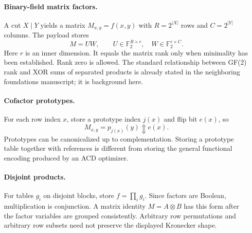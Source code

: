 \documentclass[11pt]{article}
\newcommand{\F}{\mathbb F_2}
\newcommand{\xor}{\mathbin{\Updownarrow}}
\theoremstyle{definition}\newtheorem{definition}[theorem]{Definition}
\theoremstyle{remark}\newtheorem{remark}[theorem]{Remark}
\begin{document}
\paragraph{Binary-field matrix factors.}
A cut $X\mid Y$ yields a matrix $M_{x,y}=f(x,y)$ with $R=2^{|X|}$ rows and $C=2^{|Y|}$ columns. The payload stores
\begin{equation}
 M=UW,\qquad U\in\F^{R\times r},\quad W\in\F^{r\times C}.
 \label{eq:rankfactor}
\end{equation}
Here $r$ is an inner dimension. It equals the matrix rank only when minimality has been established. Rank zero is allowed. The standard relationship between GF(2) rank and XOR sums of separated products is already stated in the neighboring foundations manuscript\cite{foundations}; it is background here.

\paragraph{Cofactor prototypes.}
For each row index $x$, store a prototype index $j(x)$ and flip bit $e(x)$, so
\begin{equation}
 M_{x,y}=p_{j(x)}(y)\xor e(x).
 \label{eq:cofactor}
\end{equation}
Prototypes can be canonicalized up to complementation. Storing a prototype table together with references is different from storing the general functional encoding produced by an ACD optimizer.

\paragraph{Disjoint products.}
For tables $g_i$ on disjoint blocks, store $f=\prod_i g_i$. Since factors are Boolean, multiplication is conjunction. A matrix identity $M=A\otimes B$ has this form after the factor variables are grouped consistently. Arbitrary row permutations and arbitrary row subsets need not preserve the displayed Kronecker shape.
\end{document}
